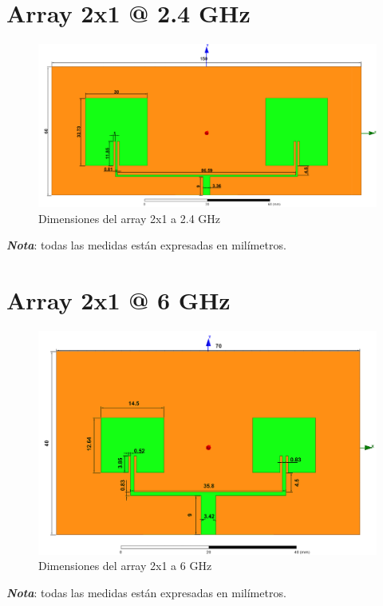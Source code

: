 \section{Array 2x1 @ 2.4 GHz}
\vfill
\begin{figure}[H]
   	 \centering
        \includegraphics[width=18cm ,height=\textwidth, keepaspectratio=true,angle=90,origin=c]{archivos/desarrollo/autocad/3}
        \caption{Dimensiones del array 2x1 a 2.4 GHz}
        \label{fig:2x11}
\end{figure}
\vfill
\textit{\textbf{Nota}}: todas las medidas están expresadas en milímetros.
\newpage

\section{Array 2x1 @ 6 GHz}
\vfill
\begin{figure}[H]
   	 \centering
        \includegraphics[width=18cm ,height=\textheight, keepaspectratio=true,angle=90,origin=c]{archivos/desarrollo/autocad/4}
        \caption{Dimensiones del array 2x1 a 6 GHz}
        \label{fig:2x12}
\end{figure}
\vfill
\textit{\textbf{Nota}}: todas las medidas están expresadas en milímetros.
\newpage

